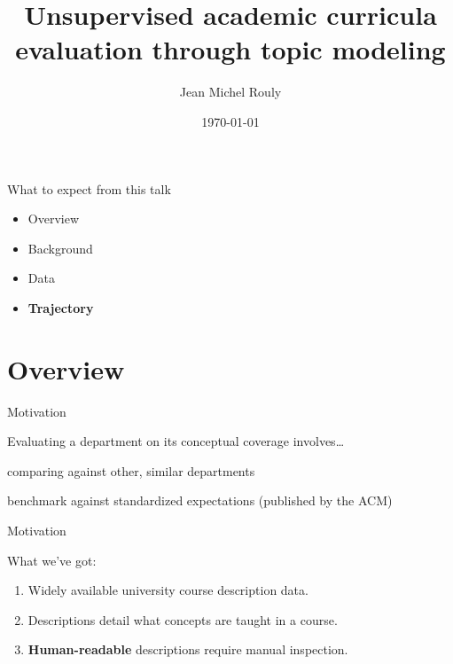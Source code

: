 \documentclass[10pt, compress]{beamer}
\title{Unsupervised academic curricula evaluation through topic modeling}
\subtitle{}
\date{\today}
\author[jrouly@gmu.edu]{Jean Michel Rouly}
\institute[Department of Computer Science]{George Mason University}
\begin{document}
\maketitle


\begin{frame}{What to expect from this talk}
  \begin{itemize}[<+- | alert@+>]
    \item Overview
    \item Background
    \item Data
    \item \textbf{Trajectory}
  \end{itemize}
\end{frame}


\section{Overview}


\begin{frame}{Motivation}

  Evaluating a department on its conceptual coverage involves\ldots
  \vfill
  \onslide<+->
  \begin{description}[<+- | alert@+>]
    \item[Relative Standing] comparing against other, similar departments
    \item[Absolute Performance] benchmark against standardized expectations
      (published by the ACM)
  \end{description}
  \vfill

\end{frame}


\begin{frame}{Motivation}
  \begin{block}{What we've got:}
    \onslide<+->
    \begin{enumerate}[<+- | alert@+>]
      \item Widely available university course description data.
      \item Descriptions detail what concepts are taught in a course.
      \item \textbf{Human-readable} descriptions require manual inspection.
    \end{enumerate}
  \end{block}

  \vfill


\end{frame}
\end{document}
